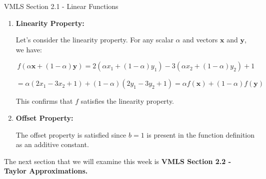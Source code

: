 \begin{notes}{VMLS Section 2.1 - Linear Functions}
\begin{Highlight}
        \begin{enumerate}
            \item \textbf{Linearity Property:}
            
            Let's consider the linearity property. For any scalar \(\alpha\) and vectors \(\mathbf{x}\) and \(\mathbf{y}\), we have:
            
            \[
            f(\alpha\mathbf{x} + (1-\alpha)\mathbf{y}) = 2(\alpha x_1 + (1-\alpha)y_1) - 3(\alpha x_2 + (1-\alpha)y_2) + 1
            \]
            
            \[
            = \alpha(2x_1 - 3x_2 + 1) + (1-\alpha)(2y_1 - 3y_2 + 1) = \alpha f(\mathbf{x}) + (1-\alpha) f(\mathbf{y})
            \]
            
            This confirms that \( f \) satisfies the linearity property.
            
            \item \textbf{Offset Property:}
            
            The offset property is satisfied since \( b = 1 \) is present in the function definition as an additive constant.
        \end{enumerate}
    \end{Highlight}
\end{notes}

The next section that we will examine this week is \textbf{VMLS Section 2.2 - Taylor Approximations.}

